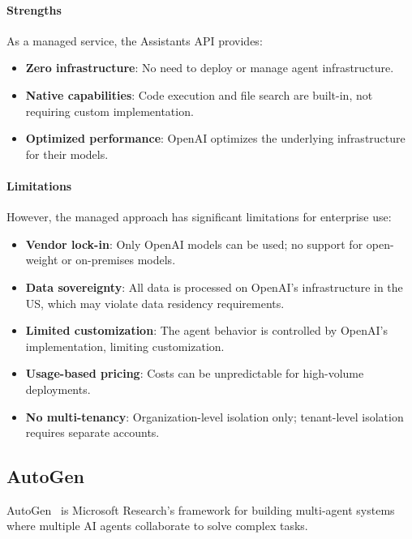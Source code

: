 \documentclass[a4paper,twoside]{sapthesis}
\begin{document}
\paragraph{Strengths}
As a managed service, the Assistants API provides:
\begin{itemize}
    \item \textbf{Zero infrastructure}: No need to deploy or manage agent infrastructure.
    \item \textbf{Native capabilities}: Code execution and file search are built-in, not requiring custom implementation.
    \item \textbf{Optimized performance}: OpenAI optimizes the underlying infrastructure for their models.
\end{itemize}

\paragraph{Limitations}
However, the managed approach has significant limitations for enterprise use:
\begin{itemize}
    \item \textbf{Vendor lock-in}: Only OpenAI models can be used; no support for open-weight or on-premises models.
    \item \textbf{Data sovereignty}: All data is processed on OpenAI's infrastructure in the US, which may violate data residency requirements.
    \item \textbf{Limited customization}: The agent behavior is controlled by OpenAI's implementation, limiting customization.
    \item \textbf{Usage-based pricing}: Costs can be unpredictable for high-volume deployments.
    \item \textbf{No multi-tenancy}: Organization-level isolation only; tenant-level isolation requires separate accounts.
\end{itemize}

\subsection{AutoGen}

AutoGen~%
is Microsoft Research's framework for building multi-agent systems where multiple AI agents collaborate to solve complex tasks.
\end{document}

